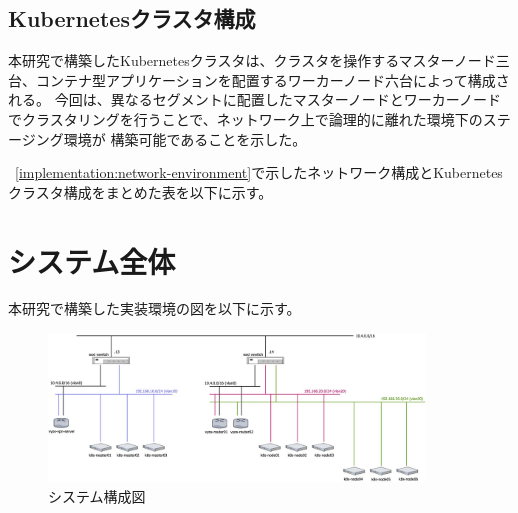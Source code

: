 \subsection{Kubernetesクラスタ構成}
\label{implementation:kubernetes-environment}
本研究で構築したKubernetesクラスタは、クラスタを操作するマスターノード三台、コンテナ型アプリケーションを配置するワーカーノード六台によって構成される。
今回は、異なるセグメントに配置したマスターノードとワーカーノードでクラスタリングを行うことで、ネットワーク上で論理的に離れた環境下のステージング環境が
構築可能であることを示した。

~\ref{implementation:network-environment}で示したネットワーク構成とKubernetesクラスタ構成をまとめた表を以下に示す。

\section{システム全体}
\label{implementation:system}
本研究で構築した実装環境の図を以下に示す。

\begin{figure}[htbp]
\begin{center}
\includegraphics[width=100mm]{./figures/system-diagram.jpg}
\caption{システム構成図}
\end{center}
\end{figure}

